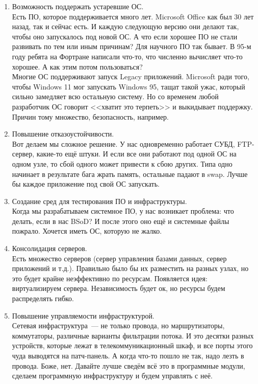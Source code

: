 \documentclass{article}
\begin{document}
    \begin{enumerate}
        \item Возможность поддержать устаревшие ОС.\\
        Есть ПО, которое поддерживается много лет. Microsoft Office как был 30 лет назад, так и сейчас есть. И каждую следующую версию они делают так, чтобы оно запускалось под новой ОС. А что если хорошее ПО не стали развивать по тем или иным причинам? Для научного ПО так бывает. В 95-м году ребята на Фортране написали что-то, что численно вычисляет что-то хорошее. А как этим потом пользоваться?\\
        Многие ОС поддерживают запуск Legacy приложений. Microsoft ради того, чтобы Windows 11 мог запускать Windows 95, тащат такой ужас, который сильно замедляет всю остальную систему. Но со временем любой разработчик ОС говорит <<хватит это терпеть>> и выкидывает поддержку. Причин тому множество, безопасность, например.
        \item Повышение отказоустойчивости.\\
        Вот делаем мы сложное решение. У нас одновременно работает СУБД, FTP-сервер, какие-то ещё штуки. И если все они работают под одной ОС на одном узле, то сбой одного может привести к сбою других. Типа одно начинает в результате бага жрать память, остальные падают в swap. Лучше бы каждое приложение под свой ОС запускать.
        \item Создание сред для тестирования ПО и инфраструктуры.\\
        Когда мы разрабатываем системное ПО, у нас возникает проблема: что делать, если в нас BSoD? И после этого оно ещё и системные файлы пожрало. Хочется иметь ОС, которую не жалко.
        \item Консолидация серверов.\\
        Есть множество серверов (сервер управления базами данных, сервер приложений и т.д.). Правильно было бы их разместить на разных узлах, но это будет крайне неэффективно по ресурсам. Появляется идея: виртуализируем сервера. Независимость будет ок, но ресурсы будем распределять гибко.
        \item  Повышение управляемости инфраструктурой.\\
        Сетевая инфраструктура~--- не только провода, но маршрутизаторы, коммутаторы, различные варианты фильтрации потока. И это десятки разных устройств, которые лежат в телекоммуникационный шкаф, и все порты этого чуда выводятся на патч-панель. А когда что-то пошло не так, надо лезть в провода. Боже, нет. Давайте лучше сведём всё это в программные модули, сделаем программную инфраструктуру и будем управлять с неё.
    \end{enumerate}
\end{document}
